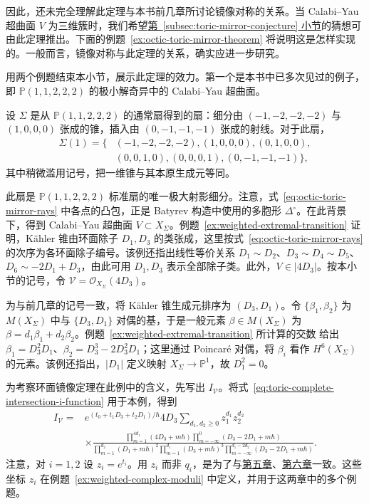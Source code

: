 因此，还未完全理解此定理与本书前几章所讨论镜像对称的关系。当 Calabi--Yau 超曲面 $V$ 为三维簇时，我们希望\hyperref[subsec:toric-mirror-conjecture]{第~\ref*{subsec:toric-mirror-conjecture} 小节}的猜想可由此定理推出。下面的例题~\ref{ex:octic-toric-mirror-theorem} 将说明这是怎样实现的。一般而言，镜像对称与此定理的关系，确实应进一步研究。

用两个例题结束本小节，展示此定理的效力。第一个是本书中已多次见过的例子，即 $\mathbb P(1,1,2,2,2)$ 的极小解奇异中的 Calabi--Yau 超曲面。
\begin{example}\label{ex:octic-toric-mirror-theorem}
设 $\Sigma$ 是从 $\mathbb P(1,1,2,2,2)$ 的通常扇得到的扇：细分由 $(-1,-2,-2,-2)$ 与 $(1,0,0,0)$ 张成的锥，插入由 $(0,-1,-1,-1)$ 张成的射线。对于此扇，
\begin{equation}\label{eq:octic-toric-mirror-rays}
\begin{aligned}
\Sigma(1)=\{&(-1,-2,-2,-2),(1,0,0,0),(0,1,0,0),\\
&(0,0,1,0),(0,0,0,1),(0,-1,-1,-1)\},
\end{aligned}
\end{equation}
其中稍微滥用记号，把一维锥与其本原生成元等同。

此扇是 $\mathbb P(1,1,2,2,2)$ 标准扇的唯一极大射影细分。注意，式~\eqref{eq:octic-toric-mirror-rays} 中各点的凸包，正是 Batyrev 构造中使用的多胞形 $\Delta^\circ$。在此背景下，得到 Calabi--Yau 超曲面 $V\subset X_\Sigma$。例题~\ref{ex:weighted-extremal-transition} 证明，Kähler 锥由环面除子 $D_1,D_3$ 的类张成，这里按式~\eqref{eq:octic-toric-mirror-rays} 的次序为各环面除子编号。该例还指出线性等价关系 $D_1\sim D_2$、$D_3\sim D_4\sim D_5$、$D_6\sim-2D_1+D_3$，由此可用 $D_1,D_3$ 表示全部除子类。此外，$V\in|4D_3|$。按本小节的记号，令 $\mathcal V=\mathcal O_{X_\Sigma}(4D_3)$。

为与前几章的记号一致，将 Kähler 锥生成元排序为 $(D_3,D_1)$。令 $\{\beta_1,\beta_2\}$ 为 $M(X_\Sigma)$ 中与 $\{D_3,D_1\}$ 对偶的基，于是一般元素 $\beta\in M(X_\Sigma)$ 为 $\beta=d_1\beta_1+d_2\beta_2$。例题~\ref{ex:weighted-extremal-transition} 所计算的交数
给出 $\beta_1=D_3^2D_1$、$\beta_2=D_3^3-2D_3^2D_1$；这里通过 Poincaré 对偶，将 $\beta_i$ 看作 $H^6(X_\Sigma)$ 的元素。该例还指出，$|D_1|$ 定义映射 $X_\Sigma\to\mathbb P^1$，故 $D_1^2=0$。

为考察环面镜像定理在此例中的含义，先写出 $I_{\mathcal V}$。将式~\eqref{eq:toric-complete-intersection-i-function} 用于本例，得到
\begin{equation}\label{eq:octic-toric-i-function}
\begin{aligned}
I_{\mathcal V}={}&e^{(t_0+t_1D_3+t_2D_1)/\hbar}4D_3\sum_{d_1,d_2\ge0}z_1^{d_1}z_2^{d_2}\\
&\times\frac{\prod_{m=1}^{4d_1}(4D_3+m\hbar)\prod_{m=-\infty}^0(D_3-2D_1+m\hbar)}{\prod_{m=1}^{d_2}(D_1+m\hbar)^2\prod_{m=1}^{d_1}(D_3+m\hbar)^3\prod_{m=-\infty}^{d_1-2d_2}(D_3-2D_1+m\hbar)}.
\end{aligned}
\end{equation}
注意，对 $i=1,2$ 设 $z_i=e^{t_i}$。用 $z_i$ 而非 $q_i$，是为了与\hyperref[chap:hodge-yukawa]{第五章}、\hyperref[chap:moduli]{第六章}一致。这些坐标 $z_i$ 在例题~\ref{ex:weighted-complex-moduli} 中定义，并用于这两章中的多个例题。


\end{example}
